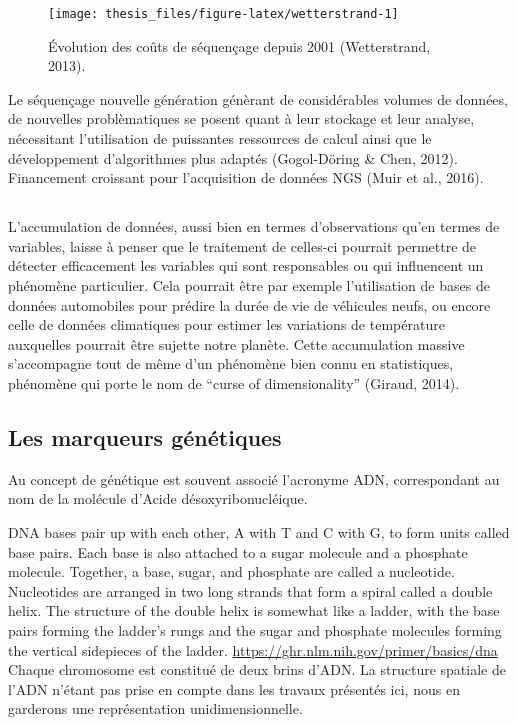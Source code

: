 \documentclass[12pt,twoside]{ugathesis}
\begin{document}
\begin{figure}

{\centering \texttt{[image: thesis\_files/figure-latex/wetterstrand-1]} 

}

\caption{Évolution des coûts de séquençage depuis 2001
(Wetterstrand, 2013).}\label{fig:wetterstrand}
\end{figure}
Le séquençage nouvelle génération génèrant de considérables volumes de
données, de nouvelles problèmatiques se posent quant à leur stockage et
leur analyse, nécessitant l'utilisation de puissantes ressources de
calcul ainsi que le développement d'algorithmes plus adaptés
(Gogol-Döring \& Chen, 2012). Financement croissant pour l'acquisition
de données NGS (Muir et al., 2016).

\subsection{}\label{section}

L'accumulation de données, aussi bien en termes d'observations qu'en
termes de variables, laisse à penser que le traitement de celles-ci
pourrait permettre de détecter efficacement les variables qui sont
responsables ou qui influencent un phénomène particulier. Cela pourrait
être par exemple l'utilisation de bases de données automobiles pour
prédire la durée de vie de véhicules neufs, ou encore celle de données
climatiques pour estimer les variations de température auxquelles
pourrait être sujette notre planète. Cette accumulation massive
s'accompagne tout de même d'un phénomène bien connu en statistiques,
phénomène qui porte le nom de ``curse of dimensionality'' (Giraud,
2014).

\subsection{Les marqueurs génétiques}\label{les-marqueurs-genetiques}

Au concept de génétique est souvent associé l'acronyme ADN,
correspondant au nom de la molécule d'Acide désoxyribonucléique.

DNA bases pair up with each other, A with T and C with G, to form units
called base pairs. Each base is also attached to a sugar molecule and a
phosphate molecule. Together, a base, sugar, and phosphate are called a
nucleotide. Nucleotides are arranged in two long strands that form a
spiral called a double helix. The structure of the double helix is
somewhat like a ladder, with the base pairs forming the ladder's rungs
and the sugar and phosphate molecules forming the vertical sidepieces of
the ladder. \url{https://ghr.nlm.nih.gov/primer/basics/dna} Chaque
chromosome est constitué de deux brins d'ADN. La structure spatiale de
l'ADN n'étant pas prise en compte dans les travaux présentés ici, nous
en garderons une représentation unidimensionnelle.
\end{document}
